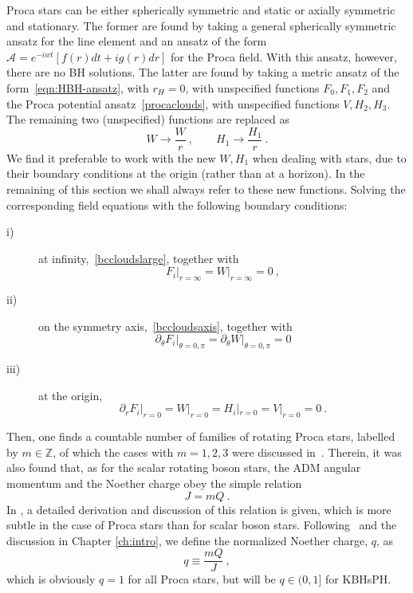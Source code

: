 Proca stars can be either spherically symmetric and static or axially symmetric and stationary. The former are found by taking a general spherically symmetric ansatz for the line element and an ansatz of the form $\mathcal{A}=e^{-iwt}\left[f(r)dt+ig(r)dr \right]$ for the Proca field.
With this ansatz, however, there are no BH solutions\cite{Herdeiro:2016tmi}. The latter are found by taking a metric ansatz of the form~\eqref{eqn:HBH-ansatz}, with $r_H=0$, with unspecified functions $F_0,F_1,F_2$ and the Proca potential ansatz~\eqref{procaclouds}, with unspecified functions $V,H_2,H_3$.
The remaining two (unspecified) functions are replaced as
\begin{equation}
W\rightarrow \frac{{W}}{r} \ , \qquad H_1\rightarrow \frac{{H_1}}{r} \ . 
\label{ww}
\end{equation}
We find it preferable to work with the new ${W},{H_1}$ when dealing with stars, due to their boundary conditions at the origin (rather than at a horizon). In the remaining of this section we shall always refer to these new functions.
Solving the corresponding field equations with the following boundary conditions:
\begin{description}
\item[i)] at infinity,~\eqref{bccloudslarge}, together with
\begin{equation}
F_i\big|_{r=\infty}={W}\big|_{r=\infty}=0 \ , 
\label{bcstarslarge}
\end{equation}
\item[ii)] on the symmetry axis,~\eqref{bccloudsaxis}, together with 
\begin{equation}
 \partial_\theta F_i\big|_{\theta=0,\pi}=\partial_\theta {W}\big|_{\theta=0,\pi}=0
 \label{bcstarsaxis}
 \end{equation}
 \item[iii)] at the origin, 
 \begin{equation}
 \partial_r F_i\big|_{r=0}={W}\big|_{r=0}=H_i|_{r=0}=V|_{r=0}=0 \ .
 \end{equation}
\end{description} 
 Then, one finds a countable number of families of rotating Proca stars, labelled by $m\in \mathbb{Z}$, of which the cases with $m=1,2,3$ were discussed in~\cite{Brito:2015pxa}.  Therein, it was also found that, as for the scalar rotating boson stars, the ADM angular momentum and the Noether charge obey the simple relation 
 \begin{equation}
 J=mQ \ .
\label{amnc}
 \end{equation}
%
In \cite{Herdeiro:2016tmi}, a detailed derivation and discussion of this relation is given, which is more subtle in the case of Proca stars than for scalar boson stars.
Following~\cite{Herdeiro:2014goa} and the discussion in Chapter \ref{ch:intro}, we define the normalized Noether charge, $q$, as 
 \begin{equation}
 q\equiv \frac{mQ}{J} \ ,
 \label{jq}
 \end{equation}
 which is obviously $q=1$ for all Proca stars, but will be $q\in (0,1]$ for KBHsPH.
 
